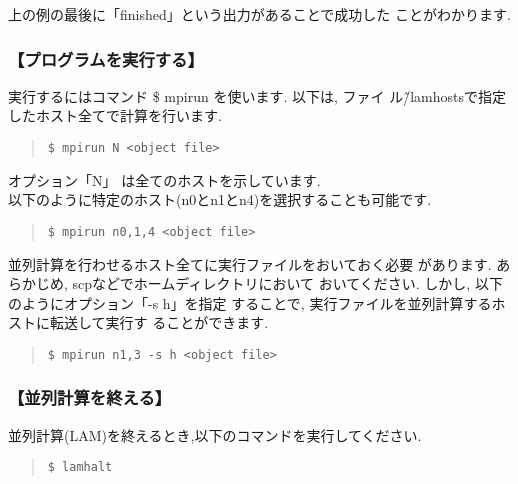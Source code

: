 \documentclass[a4paper,titlepage]{jreport}
\begin{document}
上の例の最後に「finished」という出力があることで成功した
ことがわかります.

\subsubsection{【プログラムを実行する】}
実行するにはコマンド \$ mpirun を使います. 以下は, ファイ
ル\~/lamhostsで指定したホスト全てで計算を行います.

\begin{quote}
\begin{screen}
\begin{verbatim}
$ mpirun N <object file>
\end{verbatim}
\end{screen}
\end{quote}

オプション「N」 は全てのホストを示しています.\\

以下のように特定のホスト(n0とn1とn4)を選択することも可能です.

\begin{quote}
\begin{screen}
\begin{verbatim}
$ mpirun n0,1,4 <object file>
\end{verbatim}
\end{screen}
\end{quote}

並列計算を行わせるホスト全てに実行ファイルをおいておく必要
があります. あらかじめ, scpなどでホームディレクトリにおいて
おいてください. しかし, 以下のようにオプション「-s h」を指定
することで, 実行ファイルを並列計算するホストに転送して実行す
ることができます.

\begin{quote}
\begin{screen}
\begin{verbatim}
$ mpirun n1,3 -s h <object file>
\end{verbatim}
\end{screen}
\end{quote}

\subsubsection{【並列計算を終える】}
並列計算(LAM)を終えるとき,以下のコマンドを実行してください.

\begin{quote}
\begin{screen}
\begin{verbatim}
$ lamhalt
\end{verbatim}
\end{screen}
\end{quote}
\end{document}
